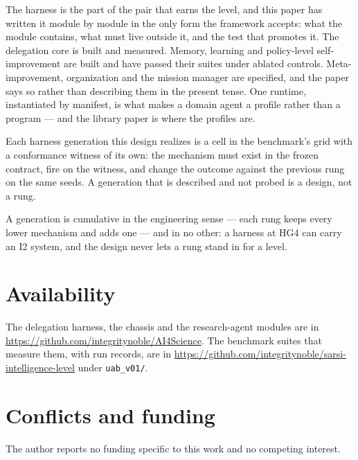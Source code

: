 The harness is the part of the pair that earns the level, and this paper has written it module by module in the only form the framework accepts: what the module contains, what must live outside it, and the test that promotes it. The delegation core is built and measured. Memory, learning and policy-level self-improvement are built and have passed their suites under ablated controls. Meta-improvement, organization and the mission manager are specified, and the paper says so rather than describing them in the present tense. One runtime, instantiated by manifest, is what makes a domain agent a profile rather than a program --- and the library paper is where the profiles are.

Each harness generation this design realizes is a cell in the benchmark's grid with a conformance witness of its own: the mechanism must exist in the frozen contract, fire on the witness, and change the outcome against the previous rung on the same seeds. A generation that is described and not probed is a design, not a rung.

A generation is cumulative in the engineering sense --- each rung keeps every lower mechanism and adds one --- and in no other: a harness at HG4 can carry an I2 system, and the design never lets a rung stand in for a level.

\section*{Availability}

The delegation harness, the chassis and the research-agent modules are in \url{https://github.com/integritynoble/AI4Science}. The benchmark suites that measure them, with run records, are in \url{https://github.com/integritynoble/sarsi-intelligence-level} under \texttt{uab\_v01/}.

\section*{Conflicts and funding}

The author reports no funding specific to this work and no competing interest.
